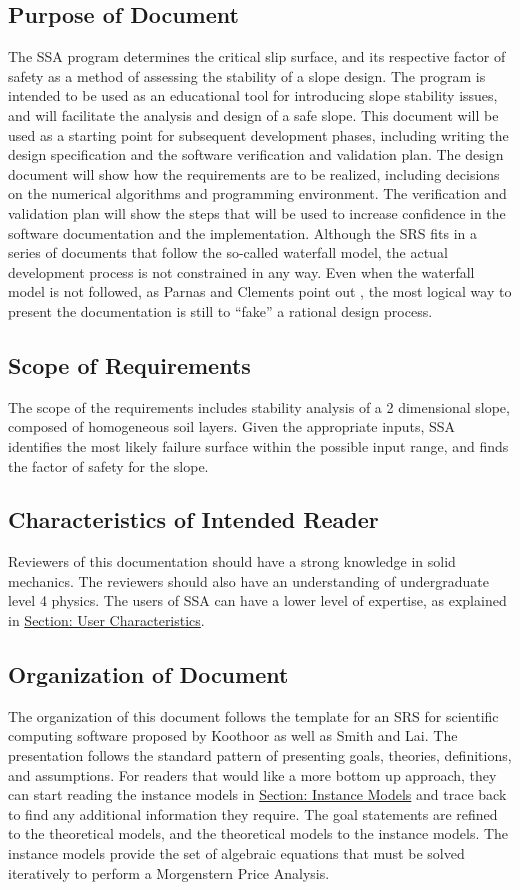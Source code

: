 \documentclass[12pt]{article}
\begin{document}
\subsection{Purpose of Document}
\label{Sec:DocPurpose}
The SSA program determines the critical slip surface, and its respective factor of safety as a method of assessing the stability of a slope design. The program is intended to be used as an educational tool for introducing slope stability issues, and will facilitate the analysis and design of a safe slope.
This document will be used as a starting point for subsequent development phases, including writing the design specification and the software verification and validation plan. The design document will show how the requirements are to be realized, including decisions on the numerical algorithms and programming environment. The verification and validation plan will show the steps that will be used to increase confidence in the software documentation and the implementation. Although the SRS fits in a series of documents that follow the so-called waterfall model, the actual development process is not constrained in any way. Even when the waterfall model is not followed, as Parnas and Clements point out \cite{parnasClements1986}, the most logical way to present the documentation is still to ``fake'' a rational design process.
\subsection{Scope of Requirements}
\label{Sec:ReqsScope}
The scope of the requirements includes stability analysis of a 2 dimensional slope, composed of homogeneous soil layers. Given the appropriate inputs, SSA identifies the most likely failure surface within the possible input range, and finds the factor of safety for the slope.
\subsection{Characteristics of Intended Reader}
\label{Sec:ReaderChars}
Reviewers of this documentation should have a strong knowledge in solid mechanics. The reviewers should also have an understanding of undergraduate level 4 physics. The users of SSA can have a lower level of expertise, as explained in \hyperref[Sec:UserChars]{Section: User Characteristics}.
\subsection{Organization of Document}
\label{Sec:DocOrg}
The organization of this document follows the template for an SRS for scientific computing software proposed by Koothoor as well as Smith and Lai. The presentation follows the standard pattern of presenting goals, theories, definitions, and assumptions. For readers that would like a more bottom up approach, they can start reading the instance models in \hyperref[Sec:IMs]{Section: Instance Models} and trace back to find any additional information they require.
The goal statements are refined to the theoretical models, and the theoretical models to the instance models. The instance models provide the set of algebraic equations that must be solved iteratively to perform a Morgenstern Price Analysis.
\end{document}
